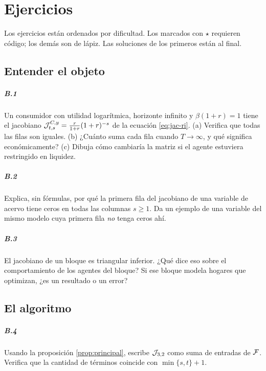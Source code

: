 \chapter{Ejercicios}
\label{ap:ejercicios}

Los ejercicios están ordenados por dificultad. Los marcados con $\star$ requieren
código; los demás son de lápiz. Las soluciones de los primeros están al final.

\section{Entender el objeto}

\paragraph{B.1} Un consumidor con utilidad logarítmica, horizonte infinito y
$\beta(1+r)=1$ tiene el jacobiano $\mathcal{J}^{C,y}_{t,s} = \frac{r}{1+r}(1+r)^{-s}$ de
la ecuación \eqref{eq:jac-ri}. (a) Verifica que todas las filas son iguales.
(b) ¿Cuánto suma cada fila cuando $T\to\infty$, y qué significa económicamente?
(c) Dibuja cómo cambiaría la matriz si el agente estuviera restringido en
liquidez.

\paragraph{B.2} Explica, sin fórmulas, por qué la primera fila del jacobiano de
una variable de acervo tiene ceros en todas las columnas $s\ge1$. Da un ejemplo
de una variable del mismo modelo cuya primera fila \emph{no} tenga ceros ahí.

\paragraph{B.3} El jacobiano de un bloque es triangular inferior. ¿Qué dice eso
sobre el comportamiento de los agentes del bloque? Si ese bloque modela hogares
que optimizan, ¿es un resultado o un error?

\section{El algoritmo}

\paragraph{B.4} Usando la proposición \ref{prop:principal}, escribe $\mathcal{J}_{3,2}$
como suma de entradas de $\mathcal{F}$. Verifica que la cantidad de términos coincide con
$\min\{s,t\}+1$.

